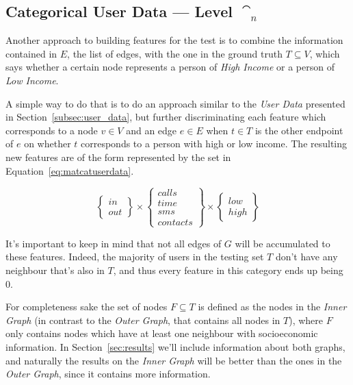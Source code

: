 \subsection{Categorical User Data --- Level $\cat_n$}
\label{subsec:categoricaluserdata}

Another approach to building features for the test is to combine the information contained in $E$, the list of edges, with the one in the ground truth $T \subseteq V$, which says whether a certain node represents a person of \emph{High Income} or a person of \emph{Low Income}.

A simple way to do that is to do an approach similar to the \emph{User Data} presented in Section~\ref{subsec:user_data}, but further discriminating each feature which corresponds to a node $v \in V$ and an edge $e \in E$ when $t \in T$ is the other endpoint of $e$ on whether $t$ corresponds to a person with high or low income. The resulting new features are of the form represented by the set in Equation~\ref{eq:matcatuserdata}.

\begin{equation}
\begin{Bmatrix} in \\ out \end{Bmatrix}
\times
\begin{Bmatrix} calls \\ time \\ sms \\ contacts \end{Bmatrix}
\times
\begin{Bmatrix} low \\ high \end{Bmatrix}
\label{eq:matcatuserdata}
\end{equation}

It's important to keep in mind that not all edges of $G$ will be accumulated to these features. Indeed, the majority of users in the testing set $T$ don't have any neighbour that's also in $T$, and thus every feature in this category ends up being $0$.

For completeness sake the set of nodes $F \subseteq T$ is defined as the nodes in the \emph{Inner Graph} (in contrast to the \emph{Outer Graph}, that contains all nodes in $T$), where $F$ only contains nodes which have at least one neighbour with socioeconomic information. In Section~\ref{sec:results} we'll include information about both graphs, and naturally the results on the \emph{Inner Graph} will be better than the ones in the \emph{Outer Graph}, since it contains more information.

